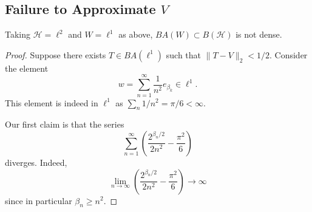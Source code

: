 \documentclass[12pt]{article}
\begin{document}
\subsection{Failure to Approximate $V$} %

\begin{theorem}
	Taking $\mathcal{H}=\ell^2$ and $W=\ell^1$ as above, $BA(W)\subset B(\mathcal{H})$ is not dense.
\end{theorem}
\begin{proof}
	Suppose there exists $T\in BA(\ell^1)$ such that $\|T-V\|_2<1/2$. Consider the element 
	\[
		w=\sum_{n=1}^\infty\frac{1}{n^2}e_{\beta_k}\in\ell^1.
	\]
	This element is indeed in $\ell^1$ as $\sum_n 1/n^2=\pi/6<\infty$. 

	Our first claim is that the series
	\[
		\sum_{n=1}^\infty \left(\frac{2^{\beta_n/2}}{2n^2} -\frac{\pi^2}{6}\right)
	\]
	diverges. Indeed, 
	\begin{equation*}
		\lim_{n\to\infty} \left(\frac{2^{\beta_n/2}}{2n^2} -\frac{\pi^2}{6}\right)\to\infty
	\end{equation*}
	since in particular $\beta_n\geq n^2$.


\end{proof}
\end{document}
